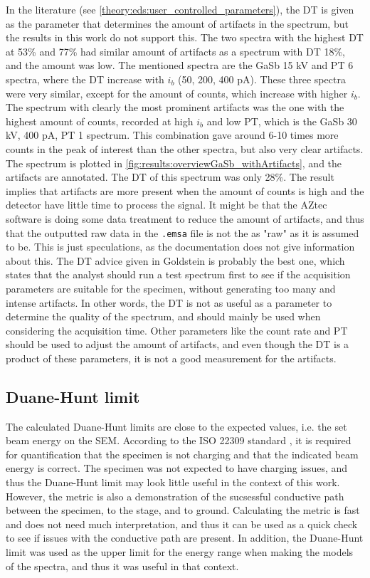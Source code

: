 In the literature (see \cref{theory:eds:user_controlled_parameters}), the DT is given as the parameter that determines the amount of artifacts in the spectrum, but the results in this work do not support this.
The two spectra with the highest DT at 53\% and 77\% had similar amount of artifacts as a spectrum with DT 18\%, and the amount was low.
The mentioned spectra are the GaSb 15 kV and PT 6 spectra, where the DT increase with $i_b$ (50, 200, 400 pA).
These three spectra were very similar, except for the amount of counts, which increase with higher $i_b$.
The spectrum with clearly the most prominent artifacts was the one with the highest amount of counts, recorded at high $i_b$ and low PT, which is the GaSb 30 kV, 400 pA, PT 1 spectrum.
This combination gave around 6-10 times more counts in the peak of interest than the other spectra, but also very clear artifacts.
The spectrum is plotted in \cref{fig:results:overviewGaSb_withArtifacts}, and the artifacts are annotated.
The DT of this spectrum was only 28\%.
The result implies that artifacts are more present when the amount of counts is high and the detector have little time to process the signal.
It might be that the AZtec software is doing some data treatment to reduce the amount of artifacts, and thus that the outputted raw data in the \verb|.emsa| file is not the as "raw" as it is assumed to be.
This is just speculations, as the documentation does not give information about this.
The DT advice given in Goldstein is probably the best one, which states that the analyst should run a test spectrum first to see if the acquisition parameters are suitable for the specimen, without generating too many and intense artifacts.
In other words, the DT is not as useful as a parameter to determine the quality of the spectrum, and should mainly be used when considering the acquisition time.
Other parameters like the count rate and PT should be used to adjust the amount of artifacts, and even though the DT is a product of these parameters, it is not a good measurement for the artifacts.



\subsection{Duane-Hunt limit}
\label{discussion:duane_hunt}

The calculated Duane-Hunt limits are close to the expected values, i.e. the set beam energy on the SEM.
According to the ISO 22309 standard \cite{iso_quantification_22309}, it is required for quantification that the specimen is not charging and that the indicated beam energy is correct.
The specimen was not expected to have charging issues, and thus the Duane-Hunt limit may look little useful in the context of this work.
However, the metric is also a demonstration of the sucsessful conductive path between the specimen, to the stage, and to ground.
Calculating the metric is fast and does not need much interpretation, and thus it can be used as a quick check to see if issues with the conductive path are present.
In addition, the Duane-Hunt limit was used as the upper limit for the energy range when making the models of the spectra, and thus it was useful in that context.


